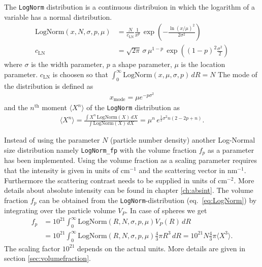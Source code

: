 The \texttt{LogNorm} distribution is a continuous distribuion in which the logarithm of a variable
has a normal distribution.
\begin{subequations}
\begin{align}
\text{LogNorm}(x,N,\sigma,p,\mu) &=  \frac{N}{c_\text{LN}}
                                    \frac{1}{x^{p}}\,
                                    \exp\!\!\left(-\frac{\ln(x/\mu)^2}{2\sigma^2}\right) \\
c_\text{LN} &= \sqrt{2\pi}\,\sigma \,\mu^{1-p}
\,\exp\!\!\left((1-p)^2\frac{\sigma^2}{2}\right)
\label{eq:LogNorm}
\end{align}
\end{subequations}
where $\sigma$ is the width parameter, $p$ a shape parameter, $\mu$ is the location parameter.
$c_\text{LN}$ is choosen so that $\int_0^\infty\! \text{LogNorm}(x,\mu,\sigma,p)\,dR = N$
The mode of the distribution is defined as
\begin{align}
x_\text{mode} = \mu e^{-p \sigma^2}
\end{align}
and the $n^\text{th}$ moment $\langle X^n\rangle$ of the \texttt{LogNorm} distribution as
\begin{align}
\langle X^n\rangle = \frac{\int X^n\, \textrm{LogNorm}(X)\, dX}{\int \textrm{LogNorm}(X)\, dX} =
\mu^n \, e^{\frac{1}{2} \sigma^2 n (2 - 2 p + n)}.
\label{eq:nMoment:LogNorm}
\end{align}

Instead of using the parameter $N$ (particle number density) another
Log-Normal size distribution namely {\tt LogNorm\_fp} with the
volume fraction $f_p$ as a parameter has been implemented.
Using the volume fraction as a scaling parameter requires that the intensity is
given in units of cm$^{-1}$ and the scattering vector in nm$^{-1}$. Furthermore
the scattering contrast needs to be supplied in units of cm$^{-2}$. More details
about absolute intensity can be found in chapter \ref{ch:absint}.
The volume fraction $f_p$ can be obtained from the \texttt{LogNorm}-distribution
(eq.\ \ref{eq:LogNorm}) by integrating over the particle volume $V_P$. In case
of spheres we get
\begin{align}
f_p &= 10^{21} \int_0^\infty \mathrm{LogNorm}(R,N,\sigma,p,\mu) V_P(R) \, dR \label{eq:fpMomentsV} \\
    &= 10^{21} \int_0^\infty \mathrm{LogNorm}(R,N,\sigma,p,\mu) \frac{4}{3}\pi R^3 \, dR = 10^{21}
    N \frac{4}{3}\pi \langle X^3 \rangle .
\end{align}
The scaling factor $10^{21}$ depends on the actual units. More details are
given in section \ref{sec:volumefraction}.


